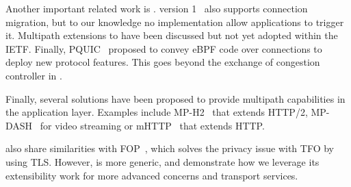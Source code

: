 Another important related work is \quic. %
\quic version 1~\cite{rfc9000} also supports connection
migration, but to our knowledge no implementation allow applications to trigger 
it. %
Multipath extensions
\cite{viernickel2018multipath,de2017multipath,draft-liu-multipath-quic-02}
to \quic have been discussed but not yet adopted within the IETF. Finally,
PQUIC~\cite{de2019pluginizing} proposed to convey eBPF code over \quic
connections to deploy new protocol features. This goes beyond the exchange of
congestion controller in \tcpls.

Finally, several solutions have been proposed to provide multipath capabilities
in the application layer. Examples include MP-H2~\cite{nikravesh2019mp} that
extends HTTP/2, MP-DASH~\cite{han2016mp} for video streaming or mHTTP~\cite{kim2014multi} that extends HTTP.

\tcpls also share similarities with \tls FOP~\cite{sy2020enhanced}, which 
solves the privacy issue with TFO by using TLS. However, \tcpls is more generic,
and demonstrate how we leverage its extensibility work for more advanced 
concerns and transport services.



